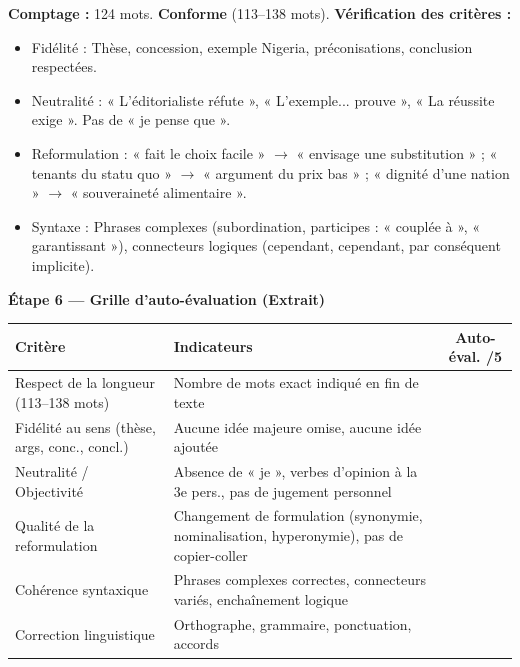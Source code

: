 \documentclass[11pt]{article}
\newcommand{\cle}[1]{{\popxbold\color{popdark}#1}}
\begin{document}
\begin{exoresolu}
\noindent \textbf{Comptage :} 124 mots. \textbf{Conforme} (113--138 mots).
\noindent \textbf{Vérification des critères :}
\begin{itemize}
    \item \cle{Fidélité} : Thèse, concession, exemple Nigeria, préconisations, conclusion respectées.
    \item \cle{Neutralité} : « L'éditorialiste réfute », « L'exemple... prouve », « La réussite exige ». Pas de « je pense que ».
    \item \cle{Reformulation} : « fait le choix facile » $\to$ « envisage une substitution » ; « tenants du statu quo » $\to$ « argument du prix bas » ; « dignité d'une nation » $\to$ « souveraineté alimentaire ».
    \item \cle{Syntaxe} : Phrases complexes (subordination, participes : « couplée à », « garantissant »), connecteurs logiques (cependant, cependant, par conséquent implicite).
\end{itemize}

\textbf{Étape 6 — Grille d'auto-évaluation (Extrait)}

\begin{center}
\begin{tabularx}{\linewidth}{|l|X|c|}\hline
\rowcolor{popblueL}
\textbf{Critère} & \textbf{Indicateurs} & \textbf{Auto-éval. /5} \\ \hline
Respect de la longueur (113--138 mots) & Nombre de mots exact indiqué en fin de texte & \\
Fidélité au sens (thèse, args, conc., concl.) & Aucune idée majeure omise, aucune idée ajoutée & \\
Neutralité / Objectivité & Absence de « je », verbes d'opinion à la 3e pers., pas de jugement personnel & \\
Qualité de la reformulation & Changement de formulation (synonymie, nominalisation, hyperonymie), pas de copier-coller & \\
Cohérence syntaxique & Phrases complexes correctes, connecteurs variés, enchaînement logique & \\
Correction linguistique & Orthographe, grammaire, ponctuation, accords & \\
\hline
\end{tabularx}
\end{center}
\end{exoresolu}
\end{document}

